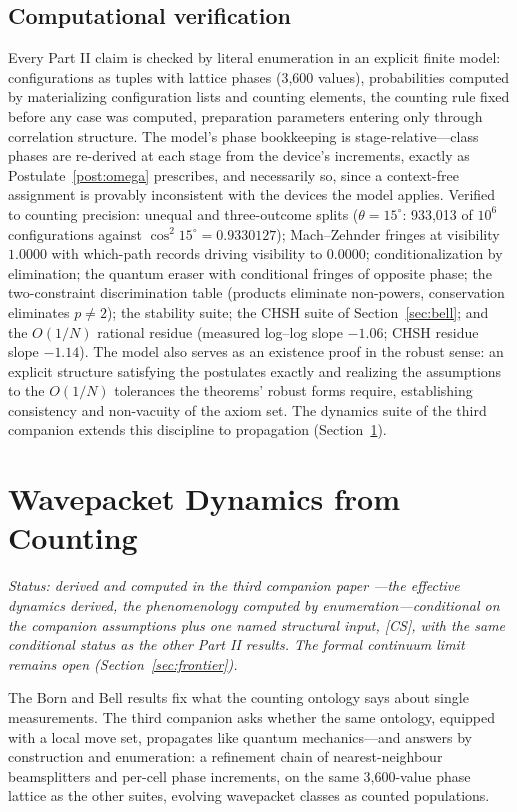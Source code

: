 \documentclass[11pt]{article}
\theoremstyle{definition}
\theoremstyle{remark}
\begin{document}
\subsection{Computational verification}\label{sec:verification}
Every Part II claim is checked by literal enumeration in an explicit finite model: configurations as tuples with lattice phases (3{,}600 values), probabilities computed by materializing configuration lists and counting elements, the counting rule fixed before any case was computed, preparation parameters entering only through correlation structure. The model's phase bookkeeping is stage-relative---class phases are re-derived at each stage from the device's increments, exactly as Postulate~\ref{post:omega} prescribes, and necessarily so, since a context-free assignment is provably inconsistent with the devices the model applies. Verified to counting precision: unequal and three-outcome splits ($\theta = 15^\circ$: 933{,}013 of $10^6$ configurations against $\cos^2 15^\circ = 0.9330127$); Mach--Zehnder fringes at visibility $1.0000$ with which-path records driving visibility to $0.0000$; conditionalization by elimination; the quantum eraser with conditional fringes of opposite phase; the two-constraint discrimination table (products eliminate non-powers, conservation eliminates $p \neq 2$); the stability suite; the CHSH suite of Section~\ref{sec:bell}; and the $O(1/N)$ rational residue (measured log--log slope $-1.06$; CHSH residue slope $-1.14$). The model also serves as an existence proof in the robust sense: an explicit structure satisfying the postulates exactly and realizing the assumptions to the $O(1/N)$ tolerances the theorems' robust forms require, establishing consistency and non-vacuity of the axiom set. The dynamics suite of the third companion \cite{TillittSchr} extends this discipline to propagation (Section~\ref{sec:schrodinger}).

\section{Wavepacket Dynamics from Counting}\label{sec:schrodinger}
\emph{Status: derived and computed in the third companion paper \cite{TillittSchr}---the effective dynamics derived, the phenomenology computed by enumeration---conditional on the companion assumptions plus one named structural input, [CS], with the same conditional status as the other Part II results. The formal continuum limit remains open (Section~\ref{sec:frontier}).}

\medskip
The Born and Bell results fix what the counting ontology says about single measurements. The third companion asks whether the same ontology, equipped with a local move set, propagates like quantum mechanics---and answers by construction and enumeration: a refinement chain of nearest-neighbour beamsplitters and per-cell phase increments, on the same 3{,}600-value phase lattice as the other suites, evolving wavepacket classes as counted populations.
\end{document}
